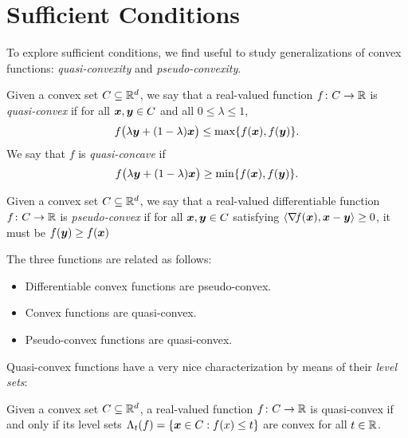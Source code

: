 
\section{Sufficient Conditions}
To explore sufficient conditions, we find useful to study generalizations of convex functions: \emph{quasi-convexity} and \emph{pseudo-convexity}.

\begin{definition}
Given a convex set $C \subseteq \mathbb{R}^d$, we say that a real-valued function $f\colon C \to \mathbb{R}$ is \emph{quasi-convex} if for all $\boldsymbol{x},\boldsymbol{y} \in C$ and all $0 \leq \lambda \leq 1$,
\begin{equation*}
f\big( \lambda \boldsymbol{y} + (1-\lambda)\boldsymbol{x} \big) \leq \max\{ f(\boldsymbol{x}), f(\boldsymbol{y}) \}.
\end{equation*}
We say that $f$ is \emph{quasi-concave} if 
\begin{equation*}
f\big( \lambda \boldsymbol{y} + (1-\lambda)\boldsymbol{x} \big) \geq \min\{ f(\boldsymbol{x}), f(\boldsymbol{y}) \}.
\end{equation*}
\end{definition}

\begin{definition}
Given a convex set $C \subseteq \mathbb{R}^d$, we say that a real-valued differentiable function $f \colon C \to \mathbb{R}$ is \emph{pseudo-convex} if for all $\boldsymbol{x}, \boldsymbol{y} \in C$ satisfying $\langle \mathop{\nabla\! {f}}(\boldsymbol{x}), \boldsymbol{x}-\boldsymbol{y} \rangle \geq 0$, it must be $f(\boldsymbol{y}) \geq f(\boldsymbol{x})$
\end{definition}

\begin{remark}
The three functions are related as follows:
\begin{itemize}
	\item Differentiable convex functions are pseudo-convex.
	\item Convex functions are quasi-convex.
	\item Pseudo-convex functions are quasi-convex.
\end{itemize}
\end{remark}

\separator 

Quasi-convex functions have a very nice characterization by means of their \emph{level sets}:

\begin{theorem}
Given a convex set $C \subseteq \mathbb{R}^d$, a real-valued function $f \colon C \to \mathbb{R}$ is quasi-convex if and only if its level sets 
$\Lambda_t(f) = \{ \boldsymbol{x} \in C : f(x) \leq t \}$ are convex for all $t \in \mathbb{R}$.
\end{theorem}

